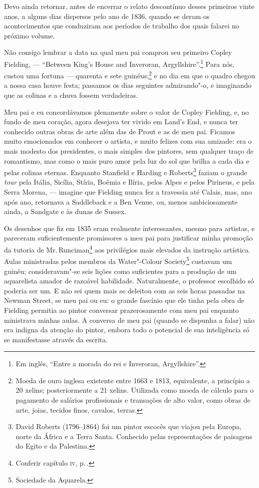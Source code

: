 Devo ainda retornar, antes de encerrar o relato descontínuo desses
primeiros vinte anos, a alguns dias dispersos pelo ano de 1836, quando
se deram os acontecimentos que conduziram aos períodos de trabalho dos
quais falarei no próximo volume.

Não consigo lembrar a data na qual meu pai comprou seu primeiro Copley
Fielding, --- ``Between King's House and Inveroran,
Argyllshire''.\footnote{Em inglês, ``Entre a morada do rei e Inveroran, Argyllshire''.} Para nós, custou uma fortuna ---
quarenta e sete guinéus;\footnote{Moeda de ouro inglesa existente entre
  1663 e 1813, equivalente, a princípio a 20 xelins; posteriormente a 21
  xelins. Utilizada como moeda de cálculo para o pagamento de salários
  profissionais e transações de alto valor, como obras de arte, joias,
  tecidos finos, cavalos, terras.} e no dia em que o
quadro chegou a nossa casa houve festa; passamos os dias seguintes
admirando"-o, e imaginando que as colinas e a chuva fossem verdadeiras.

Meu pai e eu concordávamos plenamente sobre o valor de Copley Fielding,
e, no fundo de meu coração, agora desejava ter vivido em Land's End, e
nunca ter conhecido outras obras de arte além das de Prout e as de meu
pai. Ficamos muito emocionados em conhecer o artista, e muito felizes
com sua amizade: era o mais modesto dos presidentes, o mais simples dos
pintores, sem qualquer traço de romantismo, mas como o mais puro amor
pela luz do sol que brilha a cada dia e pelas colinas eternas. Enquanto
Stanfield e Harding e Roberts\footnote{David Roberts (1796--1864) foi um pintor
  escocês que viajou pela Europa, norte da África e a Terra Santa.
  Conhecido pelas representações de paisagens do Egito e da Palestina.} faziam o grande \textit{tour} pela Itália, Sicília,
Stíria, Boêmia e Ilíria, pelos Alpes e pelos Pirineus, e pela Serra
Morena, --- imagine que Fielding nunca fez a travessia até Calais, mas,
ano após ano, retornava a Saddleback e a Ben Venue, ou, menos
ambiciosamente ainda, a Sandgate e às dunas de Sussex.

Os desenhos que fiz em 1835 eram realmente interessantes, mesmo
para artistas, e pareceram suficientemente promissores a meu pai para
justificar minha promoção da tutoria de Mr.\,Runciman\footnote{Conferir
  capítulo \textsc{iv}, p.\,\pageref{84}.} aos privilégios mais elevados da instrução
artística. Aulas ministradas pelos membros da Water"-Colour
Society\footnote{Sociedade da Aquarela.} custavam um
guinéu; consideravam"-se seis lições como suficientes para a produção de
um aquarelista amador de razoável habilidade. Naturalmente, o professor
escolhido só poderia ser um. E não sei quem mais se deleitou com as seis
horas passadas na Newman Street, se meu pai ou eu: o grande fascínio que
ele tinha pela obra de Fielding permitia ao pintor conversar
prazerosamente com meu pai enquanto ministrava minhas aulas. A conversa
de meu pai (quando se dispunha a falar) não era indigna da atenção do
pintor, embora todo o potencial de sua inteligência só se manifestasse
através da escrita.


